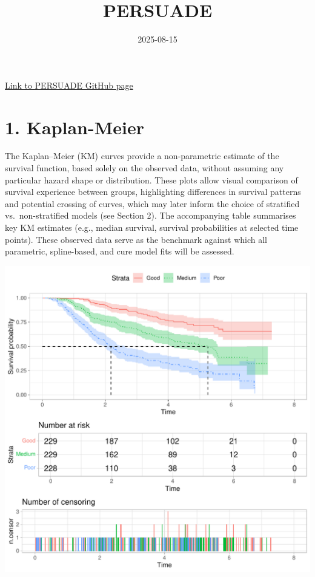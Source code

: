 \documentclass[
]{article}
\title{PERSUADE}
\author{}
\date{\vspace{-2.5em}2025-08-15}
\begin{document}
\maketitle

{
\hypersetup{linkcolor=}
\setcounter{tocdepth}{2}
\tableofcontents
}
\hfill\break

\href{https://github.com/Bram-R/PERSUADE}{Link to PERSUADE GitHub page}

\clearpage

\section{1. Kaplan-Meier}\label{kaplan-meier}

The Kaplan--Meier (KM) curves provide a non-parametric estimate of the
survival function, based solely on the observed data, without assuming
any particular hazard shape or distribution. These plots allow visual
comparison of survival experience between groups, highlighting
differences in survival patterns and potential crossing of curves, which
may later inform the choice of stratified vs.~non-stratified models (see
Section 2). The accompanying table summarises key KM estimates (e.g.,
median survival, survival probabilities at selected time points). These
observed data serve as the benchmark against which all parametric,
spline-based, and cure model fits will be assessed.

\clearpage

\begin{flushleft}\includegraphics{BC_OS_output/Images/Figure_plot_KM-1} \end{flushleft}
\end{document}
